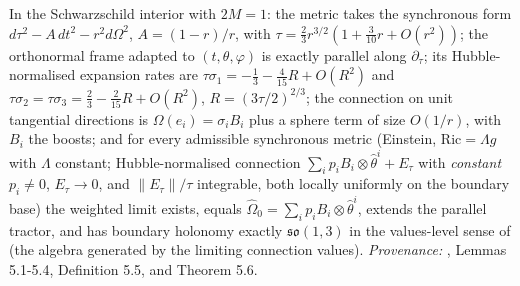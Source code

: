 In the Schwarzschild interior with $2M = 1$: the metric takes the synchronous form $d\tau^2 - A\,dt^2 - r^2 d\Omega^2$, $A = (1-r)/r$, with $\tau = \tfrac23 r^{3/2}(1 + \tfrac{3}{10}r + O(r^2))$; the orthonormal frame adapted to $(t, \theta, \varphi)$ is exactly parallel along $\partial_\tau$; its Hubble-normalised expansion rates are $\tau\sigma_1 = -\tfrac13 - \tfrac{4}{15}R + O(R^2)$ and $\tau\sigma_2 = \tau\sigma_3 = \tfrac23 - \tfrac{2}{15}R + O(R^2)$, $R = (3\tau/2)^{2/3}$; the connection on unit tangential directions is $\Omega(e_i) = \sigma_i B_i$ plus a sphere term of size $O(1/r)$, with $B_i$ the boosts; and for every admissible synchronous metric (Einstein, $\mathrm{Ric} = \Lambda g$ with $\Lambda$ constant; Hubble-normalised connection $\sum_i p_iB_i \otimes \hat\theta^i + E_\tau$ with \emph{constant} $p_i \neq 0$, $E_\tau \to 0$, and $\|E_\tau\|/\tau$ integrable, both locally uniformly on the boundary base) the weighted limit exists, equals $\widehat\Omega_0 = \sum_i p_i B_i \otimes \hat\theta^i$, extends the parallel tractor, and has boundary holonomy exactly $\mathfrak{so}(1,3)$ in the values-level sense of \cite[Def.~5.5]{ButlerT6} (the algebra generated by the limiting connection values). \emph{Provenance:} \cite{ButlerT6}, Lemmas 5.1-5.4, Definition 5.5, and Theorem 5.6.

